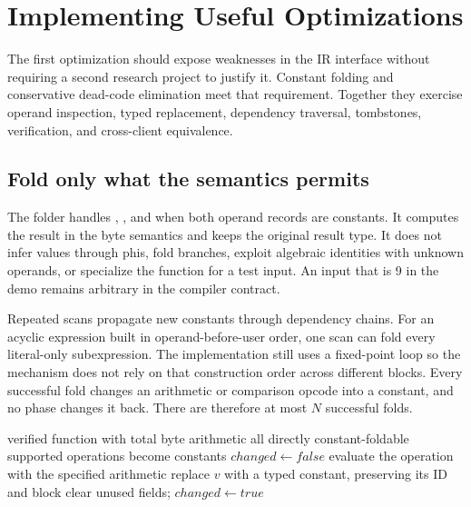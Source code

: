 \chapter{Implementing Useful Optimizations}
\label{ch:pebble-optimization}

The first optimization should expose weaknesses in the IR interface without requiring a second research project to justify it.
Constant folding and conservative dead-code elimination meet that requirement.
Together they exercise operand inspection, typed replacement, dependency traversal, tombstones, verification, and cross-client equivalence.

\section{Fold only what the semantics permits}
\label{sec:pebble-fold}
The folder handles , , and  when both operand records are constants.
It computes the result in the byte semantics and keeps the original result type.
It does not infer values through phis, fold branches, exploit algebraic identities with unknown operands, or specialize the function for a test input.
An input that is 9 in the demo remains arbitrary in the compiler contract.

Repeated scans propagate new constants through dependency chains.
For an acyclic expression built in operand-before-user order, one scan can fold every literal-only subexpression.
The implementation still uses a fixed-point loop so the mechanism does not rely on that construction order across different blocks.
Every successful fold changes an arithmetic or comparison opcode into a constant, and no phase changes it back.
There are therefore at most $N$ successful folds.

\begin{algorithm}[htbp]
\caption{Monotone constant folding in the fixed instruction set.}
\label{alg:pebble-fold}
\begin{pseudocode}
\Require verified function with total byte arithmetic
\Ensure all directly constant-foldable supported operations become constants
\Repeat
\State $changed\gets false$
\State evaluate the operation with the specified arithmetic
\State replace $v$ with a typed constant, preserving its ID and block
\State clear unused fields; $changed\gets true$
\EndIf
\EndFor
{}
\end{pseudocode}
\end{algorithm}

